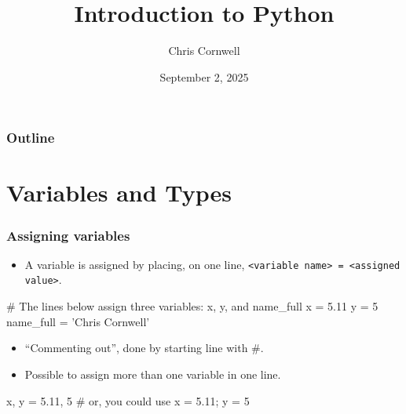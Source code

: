 \documentclass{beamer}
\author{Chris Cornwell}
\date{September 2, 2025}
\title{Introduction to Python}
\newenvironment{codeblock}
    {\hfill\begin{beamerboxesrounded}[lower=codecol, width=0.8\textwidth]
    \medskip

    }
    { 
    \end{beamerboxesrounded}\hfill
    }
\theoremstyle{example}
\newcommand{\ttt}[1]{{\small\texttt{#1}}}
\begin{document}
\begin{frame}
\titlepage
\end{frame}

\begin{frame}
\frametitle{Outline}
\tableofcontents
\end{frame}

\section{Variables and Types}

\begin{frame}[fragile]
\frametitle{Assigning variables}

\begin{itemize}
	\item A variable is assigned by placing, on one line, \mbox{\ttt{<variable name> = <assigned value>}.}
\end{itemize}
\begin{codeblock}

\begin{python}
# The lines below assign three variables: x, y, and name_full
x = 5.11
y = 5
name_full = 'Chris Cornwell'
\end{python}

\end{codeblock}

\pause
\begin{itemize}
	\item ``Commenting out'', done by starting line with \#.
    \pause
	\item Possible to assign more than one variable in one line.
\end{itemize}

\begin{codeblock}

\begin{python}
x, y = 5.11, 5
# or, you could use 
x = 5.11; y = 5
\end{python}

\end{codeblock}
\end{frame}
\end{document}
